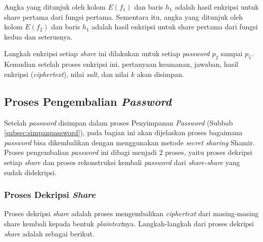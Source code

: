 Angka yang ditunjuk oleh kolom \begin{math}E(f_1)\end{math} dan baris \begin{math}h_1\end{math} adalah hasil enkripsi untuk share pertama dari fungsi pertama. Sementara itu, angka yang ditunjuk oleh kolom \begin{math}E(f_2)\end{math} dan baris \begin{math}h_1\end{math} adalah hasil enkripsi untuk share pertama dari fungsi kedua dan seterusnya.

Langkah enkripsi setiap \textit{share} ini dilakukan untuk setiap \textit{password} \begin{math}p_2\end{math} sampai \begin{math}p_5\end{math}. Kemudian setelah proses enkripsi ini, pertanyaan keamanan, jawaban, hasil enkripsi (\textit{ciphertext}), nilai \textit{salt}, dan nilai \begin{math}k\end{math} akan disimpan.

\subsection{Proses Pengembalian \textit{Password}}

Setelah \textit{password} disimpan dalam proses Penyimpanan \textit{Password} (Subbab \ref{subsec:simpanpassword}), pada bagian ini akan dijelaskan proses bagaimana \textit{password} bisa dikembalikan dengan menggunakan metode \textit{secret sharing} Shamir. Proses pengembalian \textit{password} ini dibagi menjadi 2 proses, yaitu proses dekripsi setiap \textit{share} dan proses rekonstruksi kembali \textit{password} dari \textit{share-share} yang sudah didekripsi.

\subsubsection{Proses Dekripsi \textit{Share}}

Proses dekripsi \textit{share} adalah proses mengembalikan \textit{ciphertext} dari masing-masing share kembali kepada bentuk \textit{plaintext}nya. Langkah-langkah dari proses dekripsi \textit{share} adalah sebagai berikut.

